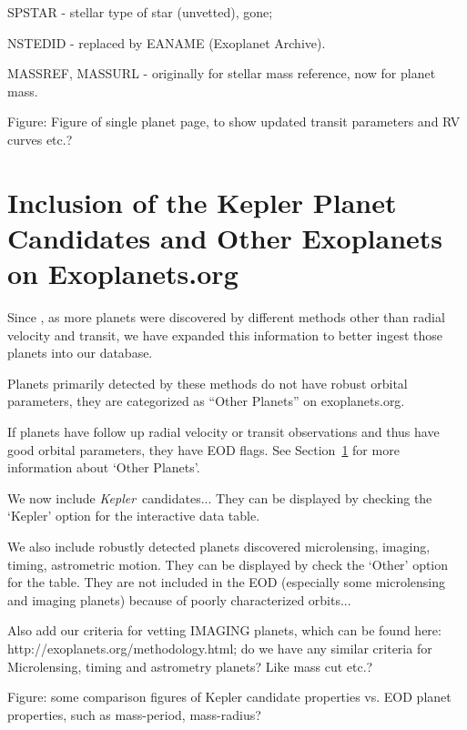 \documentclass[11pt,preprint]{aastex}
\def\kepler{\textit{Kepler}}
\begin{document}
\begin{CJK*}{UTF8}{gbsn}
SPSTAR - stellar type of star (unvetted), gone;

NSTEDID - replaced by EANAME (Exoplanet Archive).

MASSREF, MASSURL - originally for stellar mass reference, now for planet mass.

Figure: Figure of single planet page, to show updated transit
parameters and RV curves etc.?


\section{Inclusion of the Kepler Planet Candidates and Other Exoplanets on Exoplanets.org}\label{sec:kepler}

Since \cite{Wright2011}, as more planets were discovered
by different methods other than radial velocity and transit, we have expanded this information to better ingest those planets into our database.

Planets primarily detected by these methods do not have robust orbital parameters, they are categorized as ``Other Planets'' on exoplanets.org. 

If planets have follow up radial velocity or transit observations and
thus have good orbital parameters, they have EOD flags. See
Section~\ref{sec:kepler} for more information about `Other Planets'. 


We now include \kepler\ candidates... They can be displayed by
checking the `Kepler' option for the interactive data table.

We also include robustly detected planets discovered microlensing,
imaging, timing, astrometric motion. They can be displayed by check
the `Other' option for the table. They are not included in the EOD
(especially some microlensing and imaging planets) because of poorly
characterized orbits...

Also add our criteria for vetting IMAGING planets, which can be found
here: http://exoplanets.org/methodology.html; do we have any similar
criteria for Microlensing, timing and astrometry planets? Like mass
cut etc.?

Figure: some comparison figures of Kepler candidate properties
vs. EOD planet properties, such as mass-period, mass-radius?



\end{CJK*}
\end{document}

